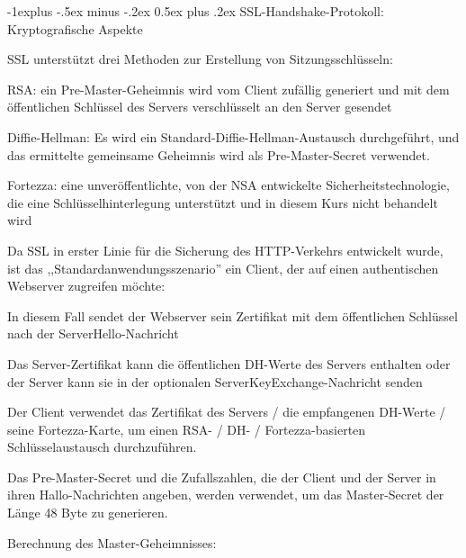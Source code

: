 \documentclass[a4paper]{article}
\makeatletter
\renewcommand{\subsection}{\@startsection{subsection}{2}{0mm}%
 {-1explus -.5ex minus -.2ex}%
 {0.5ex plus .2ex}%
 {\normalfont\normalsize\bfseries}}
\makeatother
\begin{document}
\begin{multicols}{3}
\begin{itemize*}
            \subsection{SSL-Handshake-Protokoll: Kryptografische
                  Aspekte}

            \begin{itemize*}
                  \item
                  SSL unterstützt drei Methoden zur Erstellung von Sitzungsschlüsseln:

                  \begin{itemize*}
                        \item RSA: ein Pre-Master-Geheimnis wird vom Client zufällig generiert und mit dem öffentlichen Schlüssel des Servers verschlüsselt an den Server gesendet
                        \item Diffie-Hellman: Es wird ein Standard-Diffie-Hellman-Austausch durchgeführt, und das ermittelte gemeinsame Geheimnis wird als Pre-Master-Secret verwendet.
                        \item Fortezza: eine unveröffentlichte, von der NSA entwickelte Sicherheitstechnologie, die eine Schlüsselhinterlegung unterstützt und in diesem Kurs nicht behandelt wird
                  \end{itemize*}
                  \item
                  Da SSL in erster Linie für die Sicherung des HTTP-Verkehrs entwickelt
                  wurde, ist das ,,Standardanwendungsszenario'' ein Client, der auf
                  einen authentischen Webserver zugreifen möchte:

                  \begin{itemize*}
                        \item In diesem Fall sendet der Webserver sein Zertifikat mit dem öffentlichen Schlüssel nach der ServerHello-Nachricht
                        \item Das Server-Zertifikat kann die öffentlichen DH-Werte des Servers enthalten oder der Server kann sie in der optionalen ServerKeyExchange-Nachricht senden
                        \item Der Client verwendet das Zertifikat des Servers / die empfangenen DH-Werte / seine Fortezza-Karte, um einen RSA- / DH- / Fortezza-basierten Schlüsselaustausch durchzuführen.
                  \end{itemize*}
                  \item
                  Das Pre-Master-Secret und die Zufallszahlen, die der Client und der
                  Server in ihren Hallo-Nachrichten angeben, werden verwendet, um das
                  Master-Secret der Länge 48 Byte zu generieren.
                  \item
                  Berechnung des Master-Geheimnisses:


\end{itemize*}
\end{itemize*}
\end{multicols}
\end{document}
